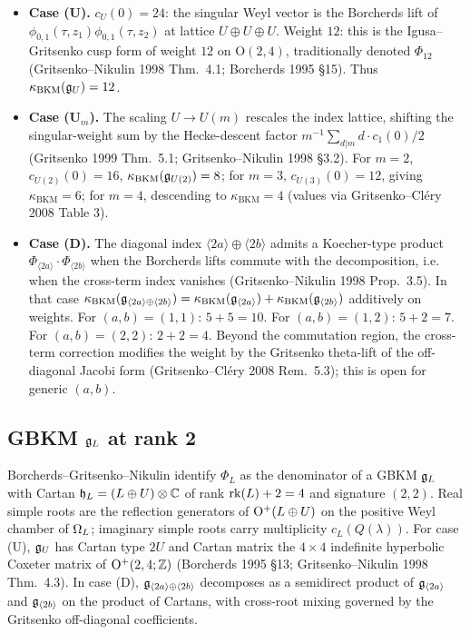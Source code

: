 \begin{itemize}
\item \textbf{Case (U).} $c_U(0) = 24$: the singular Weyl vector is the
Borcherds lift of $\phi_{0,1}(\tau, z_1) \phi_{0,1}(\tau, z_2)$ at lattice
$U \oplus U \oplus U$. Weight $12$: this is the Igusa--Gritsenko cusp
form of weight $12$ on $\mathrm{O}(2, 4)$, traditionally denoted $\Phi_{12}$
(Gritsenko--Nikulin 1998 Thm.~4.1; Borcherds 1995 \S15). Thus
$\kappa_{\mathrm{BKM}}(\mathfrak{g}_U) = 12$.

\item \textbf{Case (U$_m$).} The scaling $U \to U(m)$ rescales the index
lattice, shifting the singular-weight sum by the Hecke-descent factor
$m^{-1} \sum_{d | m} d \cdot c_1(0) / 2$ (Gritsenko 1999 Thm.~5.1;
Gritsenko--Nikulin 1998 \S3.2). For $m = 2$, $c_{U(2)}(0) = 16$,
$\kappa_{\mathrm{BKM}}(\mathfrak{g}_{U(2)}) = 8$; for $m = 3$, $c_{U(3)}(0) = 12$,
giving $\kappa_{\mathrm{BKM}} = 6$; for $m = 4$, descending to
$\kappa_{\mathrm{BKM}} = 4$ (values via Gritsenko--Cl\'ery 2008 Table 3).

\item \textbf{Case (D).} The diagonal index $\langle 2a \rangle \oplus
\langle 2b \rangle$ admits a Koecher-type product
$\Phi_{\langle 2a \rangle} \cdot \Phi_{\langle 2b \rangle}$ when the
Borcherds lifts commute with the decomposition, i.e. when the cross-term
index vanishes (Gritsenko--Nikulin 1998 Prop.~3.5). In that case
$\kappa_{\mathrm{BKM}}(\mathfrak{g}_{\langle 2a \rangle \oplus \langle 2b \rangle}) =
\kappa_{\mathrm{BKM}}(\mathfrak{g}_{\langle 2a \rangle}) + \kappa_{\mathrm{BKM}}(\mathfrak{g}_{\langle 2b \rangle})$
additively on weights. For $(a, b) = (1, 1)$: $5 + 5 = 10$. For $(a, b) = (1, 2)$:
$5 + 2 = 7$. For $(a, b) = (2, 2)$: $2 + 2 = 4$. Beyond the commutation
region, the cross-term correction modifies the weight by the Gritsenko
theta-lift of the off-diagonal Jacobi form
(Gritsenko--Cl\'ery 2008 Rem.~5.3); this is open for generic $(a, b)$.
\end{itemize}

\subsection*{GBKM $\mathfrak{g}_L$ at rank 2}

Borcherds--Gritsenko--Nikulin identify $\Phi_L$ as the denominator of a
GBKM $\mathfrak{g}_L$ with Cartan $\mathfrak{h}_L = (L \oplus U) \otimes \mathbb{C}$ of rank
$\mathrm{rk}(L) + 2 = 4$ and signature $(2, 2)$. Real simple roots are the
reflection generators of $\mathrm{O}^+(L \oplus U)$ on the positive Weyl
chamber of $\Omega_L$; imaginary simple roots carry multiplicity $c_L(Q(\lambda))$.
For case (U), $\mathfrak{g}_U$ has Cartan type $2 U$ and Cartan matrix the
$4 \times 4$ indefinite hyperbolic Coxeter matrix of
$\mathrm{O}^+(2, 4; \mathbb{Z})$ (Borcherds 1995 \S13; Gritsenko--Nikulin 1998
Thm.~4.3). In case (D), $\mathfrak{g}_{\langle 2a \rangle \oplus \langle 2b \rangle}$
decomposes as a semidirect product of $\mathfrak{g}_{\langle 2a \rangle}$ and
$\mathfrak{g}_{\langle 2b \rangle}$ on the product of Cartans, with cross-root
mixing governed by the Gritsenko off-diagonal coefficients.

